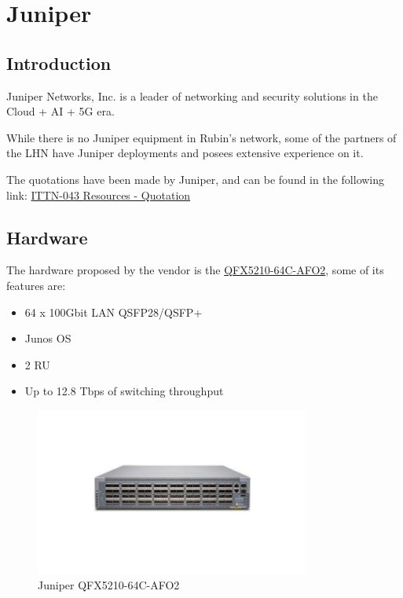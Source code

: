 \section{Juniper}

\subsection{Introduction}

Juniper Networks, Inc. is a leader of networking and security solutions in the Cloud + AI + 5G era.

While there is no Juniper equipment in Rubin's network, some of the partners of the LHN have Juniper deployments and posees extensive experience on it. 

The quotations have been made by Juniper, and can be found in the following link: \href{https://confluence.lsstcorp.org/display/IT/ITTN-043+-+Rubin+Network+Re-Engineering}{ITTN-043 Resources - Quotation}

\subsection{Hardware}

The hardware proposed by the vendor is the \href{https://www.juniper.net/us/en/products/switches/qfx-series/qfx5210-switch-datasheet.html}{QFX5210-64C-AFO2}, some of its features are:

\begin{itemize}
\item 64 x 100Gbit LAN QSFP28/QSFP+
\item Junos OS
\item 2 RU 
\item Up to 12.8 Tbps of switching throughput
\end{itemize}

\begin{figure}
    \includegraphics[width=9cm]{images/juniper_qfx5210-64c-afo2.jpeg}
    \centering
    \caption{Juniper QFX5210-64C-AFO2}
  \end{figure}



